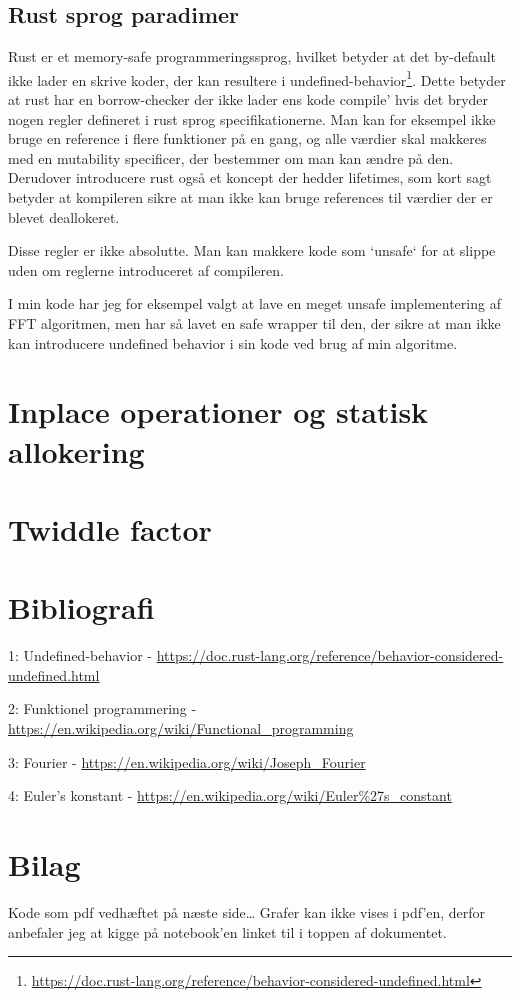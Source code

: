 \documentclass[11pt,a4paper]{article}
\begin{document}
\subsection{Rust sprog paradimer}
\label{sec:org6816d8b}
Rust er et memory-safe programmeringssprog,
hvilket betyder at det by-default ikke lader en skrive koder, der kan resultere i undefined-behavior\footnote{\url{https://doc.rust-lang.org/reference/behavior-considered-undefined.html}}.
Dette betyder at rust har en borrow-checker der ikke lader ens kode compile' hvis det bryder nogen regler defineret i rust sprog specifikationerne.
Man kan for eksempel ikke bruge en reference i flere funktioner på en gang, og alle værdier skal makkeres med
en mutability specificer, der bestemmer om man kan ændre på den. Derudover introducere rust også et koncept der hedder lifetimes,
som kort sagt betyder at kompileren sikre at man ikke kan bruge references til værdier der er blevet deallokeret.

\bigskip

Disse regler er ikke absolutte. Man kan makkere kode som `unsafe` for at slippe uden om reglerne introduceret af compileren.

I min kode har jeg for eksempel valgt at lave en meget unsafe implementering af FFT algoritmen,
men har så lavet en safe wrapper til den, der sikre at man ikke kan introducere undefined behavior i sin kode ved brug af min algoritme.

\section{Inplace operationer og statisk allokering}
\label{sec:org2650200}

\section{Twiddle factor}
\label{sec:org1f03919}

\section{Bibliografi}
\label{sec:org79bf6c7}

1: Undefined-behavior - \url{https://doc.rust-lang.org/reference/behavior-considered-undefined.html}

2: Funktionel programmering - \url{https://en.wikipedia.org/wiki/Functional\_programming}

3: Fourier - \url{https://en.wikipedia.org/wiki/Joseph\_Fourier}

4: Euler's konstant - \url{https://en.wikipedia.org/wiki/Euler\%27s\_constant}


\section{Bilag}
\label{sec:orgab44a44}

Kode som pdf vedhæftet på næste side\ldots{}
Grafer kan ikke vises i pdf'en, derfor anbefaler jeg at kigge på notebook'en linket til i toppen af dokumentet.


\end{document}
